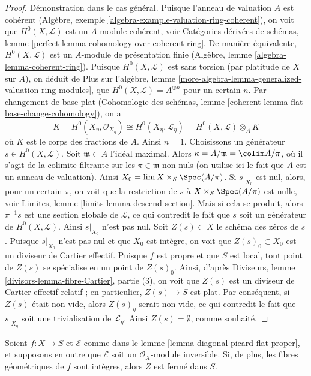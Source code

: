 \begin{proof}
\medskip\noindent
Démonstration dans le cas général. Puisque l'anneau de valuation $A$ est
cohérent (Algèbre, exemple \ref{algebra-example-valuation-ring-coherent}),
on voit que $H^0(X, \mathcal{L})$ est un $A$-module cohérent, voir
Catégories dérivées de schémas, lemme
\ref{perfect-lemma-cohomology-over-coherent-ring}.
De manière équivalente, $H^0(X, \mathcal{L})$ est un
$A$-module de présentation finie (Algèbre, lemme \ref{algebra-lemma-coherent-ring}).
Puisque $H^0(X, \mathcal{L})$ est sans torsion (par platitude de $X$ sur $A$),
on déduit de Plus sur l'algèbre, lemme
\ref{more-algebra-lemma-generalized-valuation-ring-modules},
que $H^0(X, \mathcal{L}) = A^{\oplus n}$ pour un certain $n$.
Par changement de base plat (Cohomologie des schémas, lemme
\ref{coherent-lemma-flat-base-change-cohomology}),
on a
$$
K = H^0(X_\eta, \mathcal{O}_{X_\eta}) \cong
H^0(X_\eta, \mathcal{L}_\eta) =
H^0(X, \mathcal{L}) \otimes_A K
$$
où $K$ est le corps des fractions de $A$. Ainsi $n = 1$.
Choisissons un générateur $s \in H^0(X, \mathcal{L})$.
Soit $\mathfrak m \subset A$ l'idéal maximal.
Alors $\kappa = A/\mathfrak m = \colim A/\pi$, où
il s'agit de la colimite filtrante sur les $\pi \in \mathfrak m$ non nuls
(on utilise ici le fait que $A$ est un anneau de valuation).
Ainsi $X_0 = \lim X \times_S \Spec(A/\pi)$.
Si $s|_{X_0}$ est nul, alors, pour un certain $\pi$,
on voit que la restriction de $s$ à $X \times_S \Spec(A/\pi)$ est nulle, voir
Limites, lemme \ref{limits-lemma-descend-section}.
Mais si cela se produit, alors $\pi^{-1} s$ est
une section globale de $\mathcal{L}$, ce qui contredit
le fait que $s$ soit un générateur de $H^0(X, \mathcal{L})$.
Ainsi $s|_{X_0}$ n'est pas nul. Soit $Z(s) \subset X$ le schéma des zéros de $s$.
Puisque $s|_{X_0}$ n'est pas nul et que $X_0$ est intègre,
on voit que $Z(s)_0 \subset X_0$ est un diviseur de Cartier effectif.
Puisque $f$ est propre et que $S$ est local, tout point de $Z(s)$
se spécialise en un point de $Z(s)_0$. Ainsi, d'après
Diviseurs, lemme \ref{divisors-lemma-fibre-Cartier}, partie (3),
on voit que $Z(s)$ est un diviseur de Cartier effectif relatif ;
en particulier, $Z(s) \to S$ est plat.
Par conséquent, si $Z(s)$ était non vide, alors $Z(s)_\eta$ serait non vide,
ce qui contredit le fait que $s|_{X_\eta}$ soit une trivialisation
de $\mathcal{L}_\eta$. Ainsi $Z(s) = \emptyset$, comme souhaité.
\end{proof}

\begin{lemma}
\label{lemma-get-a-closed}
Soient $f : X \to S$ et $\mathcal{E}$ comme dans le
lemme \ref{lemma-diagonal-picard-flat-proper},
et supposons en outre que $\mathcal{E}$ soit un $\mathcal{O}_X$-module inversible.
Si, de plus, les fibres géométriques de $f$ sont
intègres, alors $Z$ est fermé dans $S$.
\end{lemma}


